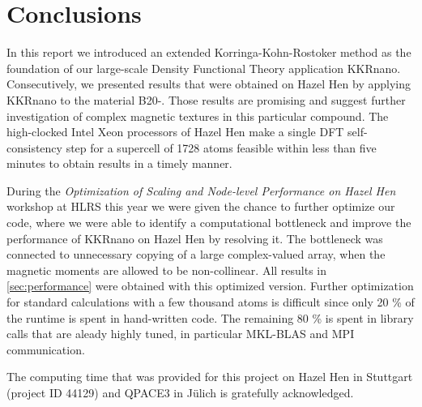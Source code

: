 \documentclass[graybox]{svmult}
\begin{document}
\section{Conclusions}
In this report we introduced an extended Korringa-Kohn-Rostoker method as the foundation of our large-scale
Density Functional Theory application KKRnano. 
Consecutively, we presented results that were obtained on Hazel Hen 
by applying KKRnano to the material B20-.
Those results are promising and suggest further investigation
of complex magnetic textures in this particular compound.
The high-clocked Intel Xeon processors of Hazel Hen
make a single DFT self-consistency step for a supercell of 1728 atoms feasible within 
less than five minutes
to obtain results in a timely manner.

During the
\textit{Optimization of Scaling and Node-level Performance on Hazel Hen} workshop at HLRS this year we were
given the chance to further optimize our code, where we were able to identify a computational bottleneck and
improve the performance of KKRnano on Hazel Hen by resolving it. The bottleneck was
connected to unnecessary copying of a large complex-valued array, when the magnetic moments are allowed to be
non-collinear.
All results in \cref{sec:performance} were
obtained with this optimized version.
Further optimization for standard calculations with a few thousand atoms 
is difficult since only 20 \% of the runtime is spent in hand-written code. The remaining 80 \% is spent in
library calls that are aleady highly tuned, in particular MKL-BLAS and MPI communication.

%
\begin{acknowledgement}
The computing time that was provided for this project on Hazel Hen in Stuttgart (project ID 44129) and
QPACE3 in J\"ulich is gratefully acknowledged.
\end{acknowledgement}



\end{document}

